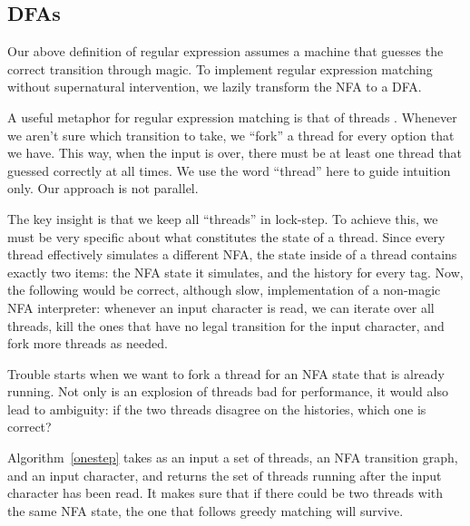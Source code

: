 \documentclass[english]{sigplanconf}
\theoremstyle{definition}
\begin{document}
\subsection{DFAs}

Our above definition of regular expression assumes a machine that
guesses the correct transition through magic. To implement regular
expression matching without supernatural intervention, we lazily transform
the NFA to a DFA. 

A useful metaphor for regular expression matching is that of threads
\cite{Cox2007}. Whenever we aren't sure which transition to take,
we ``fork'' a thread for every option that we have. This way, when
the input is over, there must be at least one thread that guessed
correctly at all times. We use the word ``thread'' here to guide
intuition only. Our approach is not parallel. 

The key insight is that we keep all ``threads'' in lock-step. To
achieve this, we must be very specific about what constitutes the
state of a thread. Since every thread effectively simulates a different
NFA, the state inside of a thread contains exactly two items: the
NFA state it simulates, and the history for every tag. Now, the following
would be correct, although slow, implementation of a non-magic NFA
interpreter: whenever an input character is read, we can iterate over
all threads, kill the ones that have no legal transition for the input
character, and fork more threads as needed.

Trouble starts when we want to fork a thread for an NFA state that
is already running. Not only is an explosion of threads bad for
performance, it would also lead to ambiguity: if the two threads
disagree on the histories, which one is correct?



Algorithm~\ref{onestep}  takes as an input a set of threads, an NFA
transition graph, and an input character, and returns the set of threads
running after the input character has been read. It makes sure that
if there could be two threads with the same NFA state, the one that
follows greedy matching will survive.
\end{document}
